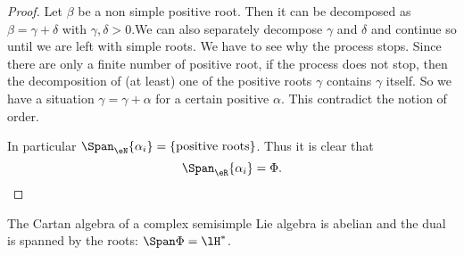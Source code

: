 \begin{proof}
	Let $\beta$ be a non simple positive root. Then it can be decomposed as $\beta=\gamma+\delta$ with $\gamma,\delta>0$.We can also separately decompose $\gamma$ and $\delta$ and continue so until we are left with simple roots. We have to see why the process stops. Since there are only a finite number of positive root, if the process does not stop, then the decomposition of (at least) one of the positive roots $\gamma$ contains $\gamma$ itself. So we have a situation $\gamma=\gamma+\alpha$ for a certain positive $\alpha$. This contradict the notion of order.

	In particular $\Span_{\eN}\{\alpha_i\}=\{\textrm{positive roots}\}$. Thus it is clear that
	\[
		\Span_{\eR}\{\alpha_i\}=\Phi.
	\]
\end{proof}


\begin{theorem}\label{tho:Phi_base}
	The Cartan algebra of a complex semisimple Lie algebra is abelian and the dual is spanned by the roots: \( \Span\Phi=\lH^*\).
\end{theorem}

